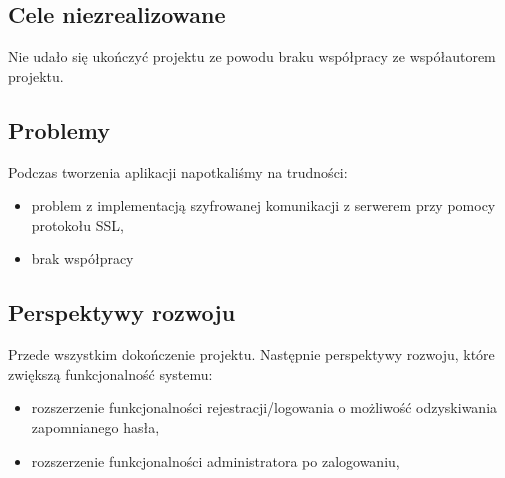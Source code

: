 \documentclass[12pt,a4paper]{article}
\begin{document}
	\subsection{Cele niezrealizowane}
	\par Nie udało się ukończyć projektu ze powodu braku współpracy ze współautorem projektu. 
	
	\subsection{Problemy}
	Podczas tworzenia aplikacji napotkaliśmy na trudności:
	\begin{itemize}
		\item problem z implementacją szyfrowanej komunikacji z serwerem przy pomocy protokołu SSL,
		\item brak współpracy 
	\end{itemize}
	
	\subsection{Perspektywy rozwoju}
	\par Przede wszystkim dokończenie projektu. Następnie perspektywy rozwoju, które zwiększą funkcjonalność systemu:
	\begin{itemize}
		\item rozszerzenie funkcjonalności rejestracji/logowania o możliwość odzyskiwania zapomnianego hasła,
		\item rozszerzenie funkcjonalności administratora po zalogowaniu,
	\end{itemize}
	
	
\end{document}

